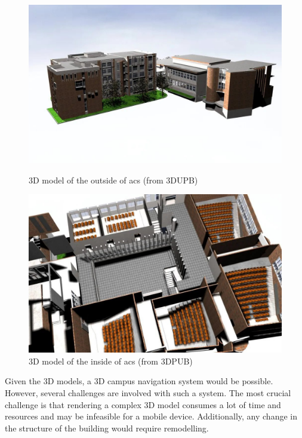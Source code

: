     \begin{figure}[!ht]
        \centering
        \begin{minipage}[b]{0.49\textwidth}
            \captionsetup{justification=centering}
             \includegraphics[width=\textwidth]{figures/navigation_apps/3dupb_outside.jpg}
            \caption{3D model of the outside of \acrshort{acs} (from 3DUPB)}
            \label{2:fig:3dupb_outside}
        \end{minipage}
        \hfill
        \begin{minipage}[b]{0.49\textwidth}
            \captionsetup{justification=centering}
             \includegraphics[width=\textwidth]{figures/navigation_apps/3dupb_inside.jpg}
            \caption{3D model of the inside of \acrshort{acs} (from 3DPUB)}
            \label{2:fig:3dupb_inside}
        \end{minipage}
    \end{figure}
    
    Given the 3D models, a 3D campus navigation system would be possible. However, several challenges are involved with such a system. The most crucial challenge is that rendering a complex 3D model consumes a lot of time and resources and may be infeasible for a mobile device. Additionally, any change in the structure of the building would require remodelling.
    
